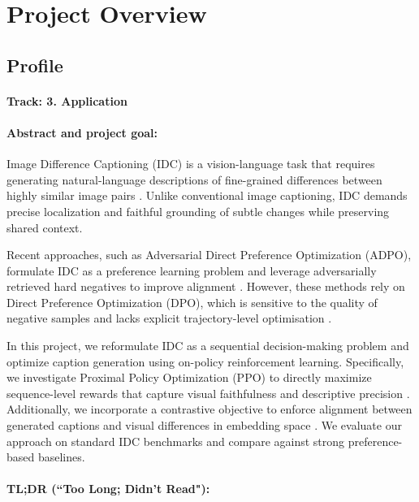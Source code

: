 \section{Project Overview}
\label{section:intro}

\subsection{Profile}

\paragraph{Track: 3. Application}

\paragraph{Abstract and project goal:}
Image Difference Captioning (IDC) is a vision-language task that requires generating natural-language descriptions of fine-grained differences between highly similar image pairs \citep{jhamtani2018learning}. Unlike conventional image captioning, IDC demands precise localization and faithful grounding of subtle changes while preserving shared context.

Recent approaches, such as Adversarial Direct Preference Optimization (ADPO), formulate IDC as a preference learning problem and leverage adversarially retrieved hard negatives to improve alignment \citep{huang-etal-2025-image}. However, these methods rely on Direct Preference Optimization (DPO), which is sensitive to the quality of negative samples and lacks explicit trajectory-level optimisation \citep{rafailov2023direct}.

In this project, we reformulate IDC as a sequential decision-making problem and optimize caption generation using on-policy reinforcement learning. Specifically, we investigate Proximal Policy Optimization (PPO) to directly maximize sequence-level rewards that capture visual faithfulness and descriptive precision \citep{schulman2017proximalpolicyoptimizationalgorithms}. Additionally, we incorporate a contrastive objective to enforce alignment between generated captions and visual differences in embedding space \citep{radford2021learning}. We evaluate our approach on standard IDC benchmarks and compare against strong preference-based baselines.

\paragraph{TL;DR (``Too Long; Didn't Read"):}

